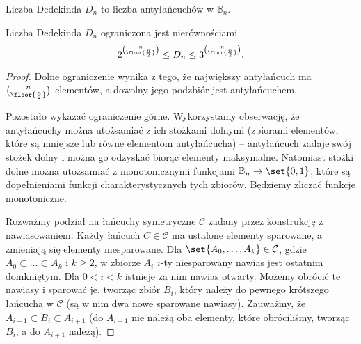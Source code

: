 \begin{definition}
	Liczba Dedekinda $D_n$ to liczba antyłańcuchów w $\mathbb B_n$.
\end{definition}

\begin{theorem}
	Liczba Dedekinda $D_n$ ograniczona jest nierównościami
	$$2^{\binom{n}{\floor{\frac n2}}} \le D_n \le 3^{\binom{n}{\floor{\frac n2}}}.$$
\end{theorem}
\begin{proof}
	Dolne ograniczenie wynika z tego, że największy antyłańcuch ma
	$\binom{n}{\floor{\frac n2}}$ elementów, a dowolny jego podzbiór jest antyłańcuchem.

	Pozostało wykazać ograniczenie górne.
	Wykorzystamy obserwację, że antyłańcuchy można utożsamiać z ich stożkami dolnymi
	(zbiorami elementów, które są mniejsze lub równe elementom antyłańcucha) --
	antyłańcuch zadaje swój stożek dolny i można go odzyskać biorąc
	elementy maksymalne. Natomiast stożki dolne można utożsamiać z monotonicznymi
	funkcjami $\mathbb B_n \to \set{0,1}$, które są dopełnieniami funkcji
	charakterystycznych tych zbiorów. Będziemy zliczać funkcje monotoniczne.

	Rozważmy podział na łańcuchy symetryczne $\mathcal C$ zadany przez konstrukcję
	z nawiasowaniem. Każdy łańcuch $C\in\mathcal C$ ma ustalone elementy
	sparowane, a zmieniają się elementy niesparowane. Dla $\set{A_0,\ldots,
			A_k}\in\mathcal C$, gdzie $A_0\subset\ldots\subset A_k$ i $k\ge 2$, w zbiorze
	$A_i$ $i$-ty niesparowany nawias jest ostatnim domkniętym. Dla $0<i<k$
	istnieje za nim nawias otwarty. Możemy obrócić te nawiasy i sparować je,
	tworząc zbiór $B_i$, który należy do pewnego krótszego łańcucha w $\mathcal
		C$ (są w nim dwa nowe sparowane nawiasy). Zauważmy, że $A_{i-1}\subset B_i
		\subset A_{i+1}$ (do $A_{i-1}$ nie należą oba elementy, które obróciliśmy,
	tworząc $B_i$, a do $A_{i+1}$ należą).


\end{proof}
